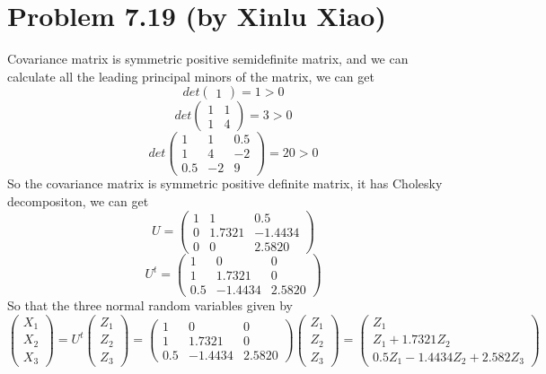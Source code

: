 \documentclass{article}
\DeclareMathOperator{\1}{\mathit{1}}
\numberwithin{figure}{section} %
\numberwithin{table}{section}
\begin{document}
\section{Problem 7.19 (by Xinlu Xiao)}
Covariance matrix is symmetric positive semidefinite matrix, and we can calculate all the leading principal minors of the matrix, we can get
\[
det\left(
\begin{matrix}
1
\end{matrix}\right) = 1 >0\]
\[
det\left(
\begin{matrix}
1 & 1\\
1 & 4
\end{matrix}\right) = 3>0\]
\[
det\left(
\begin{matrix}
1 & 1 & 0.5\\
1 & 4 & -2\\
0.5 & -2 & 9
\end{matrix}\right) = 20>0\]
So the covariance matrix is symmetric positive definite matrix, it has Cholesky decompositon, we can get
\[
U = \left(
\begin{matrix}
1 & 1 & 0.5\\
0 & 1.7321 & -1.4434\\
0 & 0 & 2.5820
\end{matrix}\right)\]
\[ 
U^{t} = \left(
\begin{matrix}
1 & 0 & 0\\
1 & 1.7321 & 0\\
0.5 & -1.4434 & 2.5820
\end{matrix}\right)
\]
So that the three normal random variables given by
\[
\left(
\begin{matrix}
X_{1}\\
X_{2}\\
X_{3}
\end{matrix}\right) = U^{t}
\left(
\begin{matrix}
Z_{1}\\
Z_{2}\\
Z_{3}
\end{matrix}\right) = 
\left(
\begin{matrix}
1 & 0 & 0\\
1 & 1.7321 & 0\\
0.5 & -1.4434 & 2.5820
\end{matrix}\right)
\left(
\begin{matrix}
Z_{1}\\
Z_{2}\\
Z_{3}
\end{matrix}\right) = 
\left(
\begin{matrix}
Z_{1} \\
Z_{1}+ 1.7321 Z_{2}\\
0.5Z_{1} -1.4434 Z_{2} + 2.582 Z_{3}
\end{matrix}\right) \]
\end{document}
